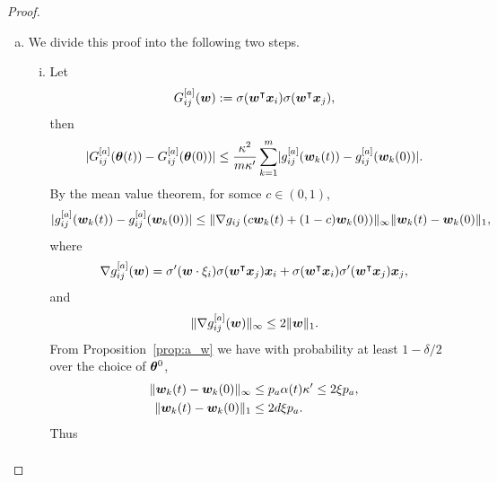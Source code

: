 \documentclass{article}
\begin{document}
\begin{proof}
\begin{enumerate}[(a)]
        \item We divide this proof into the following two steps.
              \begin{enumerate}[(i)]
                  \item Let
                        \begin{equation*}
                            G^{[a]}_{ij}(\bm{w}) := \sigma(\bm{w}^\intercal\bm{x}_i)\sigma(\bm{w}^\intercal\bm{x}_j),
                        \end{equation*}
                        then
                        \begin{equation*}
                            \lvert G_{ij}^{[a]}(\bm{\theta}(t)) - G_{ij}^{[a]}(\bm{\theta}(0))\rvert \leq \frac{\kappa^2}{m\kappa'}\sum_{k=1}^m \lvert g^{[a]}_{ij}(\bm{w}_k(t)) - g^{[a]}_{ij}(\bm{w}_k(0))\rvert.
                        \end{equation*}
                        By the mean value theorem, for somce $c\in(0,1)$,
                        \begin{equation*}
                            \lvert g^{[a]}_{ij}(\bm{w}_k(t)) - g^{[a]}_{ij}(\bm{w}_k(0))\rvert \leq \lVert\nabla g_{ij}\left(c\bm{w}_k(t) + (1-c)\bm{w}_k(0)\right)\rVert_{\infty}\lVert\bm{w}_k(t) - \bm{w}_k(0)\rVert_1,
                        \end{equation*}
                        where
                        \begin{equation*}
                            \nabla g_{ij}^{[a]}(\bm{w})=\sigma'(\bm{w}\cdot\xi_i)\sigma(\bm{w}^\intercal\bm{x}_j)\bm{x}_i+\sigma(\bm{w}^\intercal\bm{x}_i)\sigma'(\bm{w}^\intercal\bm{x}_j)\bm{x}_j,
                        \end{equation*}
                        and
                        \begin{equation*}
                            \lVert\nabla g_{ij}^{[a]}(\bm{w})\rVert_{\infty}\leq 2\lVert\bm{w}\rVert_1.
                        \end{equation*}
                        From Proposition~\ref{prop:a_w} we have with probability at least $1-\delta/2$ over the choice of $\bm{\theta}^0$,
                        \begin{align*}
                            \lVert\bm{w}_k(t)-\bm{w}_k(0)\rVert_{\infty} & \leq p_a\alpha(t)\kappa'\leq 2\xi p_a, \\
                            \lVert\bm{w}_k(t)-\bm{w}_k(0)\rVert_1        & \leq 2d\xi p_a.
                        \end{align*}
                        Thus
                        \begin{equation*}
                            \begin{aligned}

\end{aligned}
\end{equation*}
\end{enumerate}
\end{enumerate}
\end{proof}
\end{document}
